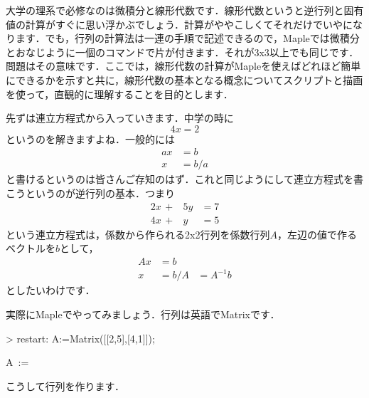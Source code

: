 大学の理系で必修なのは微積分と線形代数です．線形代数というと逆行列と固有値の計算がすぐに思い浮かぶでしょう．計算がややこしくてそれだけでいやになります．でも，行列の計算法は一連の手順で記述できるので，Mapleでは微積分とおなじように一個のコマンドで片が付きます．それが3x3以上でも同じです．問題はその意味です．ここでは，線形代数の計算がMapleを使えばどれほど簡単にできるかを示すと共に，線形代数の基本となる概念についてスクリプトと描画を使って，直観的に理解することを目的とします．

先ずは連立方程式から入っていきます．中学の時に
\begin{equation*}
4x = 2
\end{equation*}
というのを解きますよね．一般的には
\begin{equation*}
\begin {array}{rl}
ax &= b \\
x &= b/a
\end {array}
\end{equation*}
と書けるというのは皆さんご存知のはず．これと同じようにして連立方程式を書こうというのが逆行列の基本．つまり
\begin{equation*}
\begin {array}{rrl}
2x\, + &5y &=7 \\
4x\, + &y &=5
\end {array}
\end{equation*}
という連立方程式は，係数から作られる2x2行列を係数行列$A$，左辺の値で作るベクトルを$b$として，
\begin{equation*}
\begin {array}{rll}
Ax &= b & \\
x &= b/A &= A^{-1}b
\end {array}
\end{equation*}
としたいわけです．

実際にMapleでやってみましょう．行列は英語でMatrixです．
\begin{MapleInput}
> restart: A:=Matrix([[2,5],[4,1]]); 
\end{MapleInput}
\begin{MapleOutput}
A\, := \, \left[ \begin {array}{cc} 2&5\\ 4&1\end {array} \right]
\end{MapleOutput}
こうして行列を作ります．

